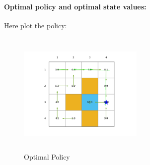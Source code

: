 \documentclass[UTF8]{ctexart}
\begin{document}
	\paragraph{Optimal policy and optimal state values:}
	Here plot the policy:
	\begin{figure}[H]
			\centering
				\includegraphics[width=6cm,height=6cm]{fig/policy1}
				\caption{Optimal Policy}
	\end{figure}
	
\end{document}
